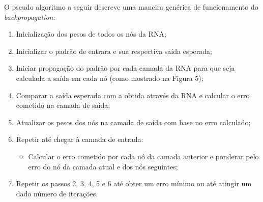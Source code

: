 O pseudo algoritmo a seguir descreve uma maneira genérica de funcionamento do \textit{backpropagation}:

\begin{enumerate}[noitemsep]
    \item Inicialização dos pesos de todos os nós da RNA;
    \item Inicializar o padrão de entrara e sua respectiva saída esperada;
    \item Iniciar propagação do padrão por cada camada da RNA para que seja calculada a saída em cada nó (como mostrado na Figura 5);
    \item Comparar a saída esperada com a obtida através da RNA e calcular o erro cometido na camada de saída;
    \item Atualizar os pesos dos nós na camada de saída com base no erro calculado;
    \item Repetir até chegar à camada de entrada:
        \begin{itemize}[noitemsep]
            \item Calcular o erro cometido por cada nó da camada anterior e ponderar pelo erro do nó da camada atual e dos nós seguintes;
        \end{itemize}
    \item Repetir os passos 2, 3, 4, 5 e 6 até obter um erro mínimo ou até atingir um dado número de iterações.
\end{enumerate}

